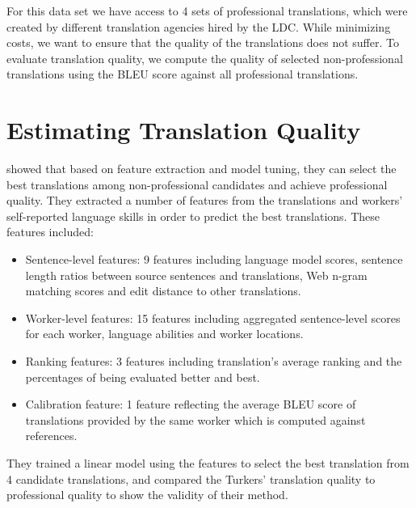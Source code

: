 \documentclass[11pt,letterpaper]{article}
\begin{document}
For this data set we have access to 4 sets of professional translations, which were created by different translation agencies hired by the LDC. While minimizing costs, we want to ensure that the quality of the translations does not suffer.  To evaluate translation quality, we compute the quality of selected  non-professional translations using the BLEU score \cite{papineni2002bleu} against all professional translations. 





\section{Estimating Translation Quality}

 showed that based on feature extraction and model tuning, they can select the best translations among non-professional candidates and achieve professional quality. They extracted a number of features from the translations and workers' self-reported language skills in order to predict the best translations. These features included:
\begin{itemize}
\item  Sentence-level features: 9 features including language model scores, sentence length ratios between source sentences and translations, Web n-gram matching scores and edit distance to other translations. 
\item Worker-level features: 15 features including aggregated sentence-level scores for each worker, language abilities and worker locations.
\item Ranking features: 3 features including translation's average ranking and the percentages of being evaluated better and best.
\item Calibration feature: 1 feature reflecting the average BLEU score of translations provided by the same worker which is computed against references.
\end{itemize}
They trained a linear model using the features to select the best translation from 4 candidate translations, and compared the Turkers' translation quality to professional quality to show the validity of their method.
\end{document}
